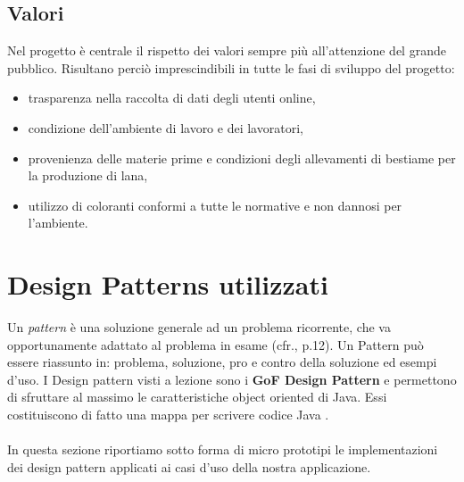 \documentclass[12pt]{article}
\begin{document}
\subsection{Valori}

Nel progetto è centrale il rispetto dei valori sempre più all'attenzione del grande pubblico. Risultano perciò imprescindibili in tutte le fasi di sviluppo del progetto:

\begin{itemize}
    \item trasparenza nella raccolta di dati degli utenti online,
    \item condizione dell'ambiente di lavoro e dei lavoratori,
    \item provenienza delle materie prime e condizioni degli allevamenti di bestiame per la produzione di lana,
    \item utilizzo di coloranti conformi a tutte le normative e non dannosi per l'ambiente.
\end{itemize}


\section{Design Patterns utilizzati}

Un {\em pattern} è una soluzione generale ad un problema ricorrente, che va opportunamente adattato al problema in esame (cfr.\cite{gof_riferimento}, p.12). Un Pattern può essere riassunto in: problema, soluzione, pro e contro della soluzione ed esempi d’uso. I Design pattern visti a lezione sono i \textbf{GoF Design Pattern} e permettono di sfruttare al massimo le caratteristiche object oriented di Java. Essi costituiscono di fatto una mappa per scrivere codice Java \cite{gof_sunt}.
\\
\\
In questa sezione riportiamo sotto forma di micro prototipi le implementazioni dei design pattern applicati ai casi d'uso della nostra applicazione.
\end{document}

